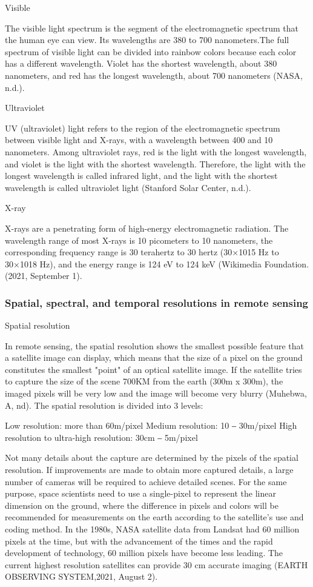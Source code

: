\documentclass[conference]{IEEEtran}
\newcommand{\subparagraph}{}
\begin{document}
\subparagraph{Visible}

 The visible light spectrum is the segment of the electromagnetic spectrum that the human eye can view. Its wavelengths are 
 380 to 700 nanometers.The full spectrum of visible light can be divided into rainbow colors because each color has a different 
 wavelength. Violet has the shortest wavelength, about 380 nanometers, and red has the longest wavelength, about 700 nanometers 
 (NASA, n.d.).
 
\subparagraph{Ultraviolet}

UV (ultraviolet) light refers to the region of the electromagnetic spectrum between visible light and X-rays, with a wavelength 
between 400 and 10 nanometers. Among ultraviolet rays, red is the light with the longest wavelength, and violet is the light 
with the shortest wavelength. Therefore, the light with the longest wavelength is called infrared light, and the light with the 
shortest wavelength is called ultraviolet light (Stanford Solar Center, n.d.).

\subparagraph{X-ray}

X-rays are a penetrating form of high-energy electromagnetic radiation. The wavelength range of most X-rays is 10 picometers 
to 10 nanometers, the corresponding frequency range is 30 terahertz to 30 hertz (30×1015 Hz to 30×1018 Hz), and the energy range 
is 124 eV to 124 keV (Wikimedia Foundation. (2021, September 1).

\subsubsection{Spatial, spectral, and temporal resolutions in remote sensing}

\subparagraph{Spatial resolution} 

In remote sensing, the spatial resolution shows the smallest possible feature that a satellite image can display, which means 
that the size of a pixel on the ground constitutes the smallest "point" of an optical satellite image. If the satellite tries 
to capture the size of the scene 700KM from the earth (300m x 300m), the imaged pixels will be very low and the image will become 
very blurry (Muhebwa, A, nd). The spatial resolution is divided into 3 levels:

Low resolution: more than 60m/pixel
Medium resolution: 10 ‒ 30m/pixel
High resolution to ultra-high resolution: 30cm ‒ 5m/pixel

Not many details about the capture are determined by the pixels of the spatial resolution. If improvements are made to obtain 
more captured details, a large number of cameras will be required to achieve detailed scenes. For the same purpose, space scientists 
need to use a single-pixel to represent the linear dimension on the ground, where the difference in pixels and colors will be 
recommended for measurements on the earth according to the satellite's use and coding method. In the 1980s, NASA satellite data from 
Landsat had 60 million pixels at the time, but with the advancement of the times and the rapid development of technology, 60 million 
pixels have become less leading. The current highest resolution satellites can provide 30 cm accurate imaging (EARTH OBSERVING SYSTEM,2021, August 2). 
\end{document}
